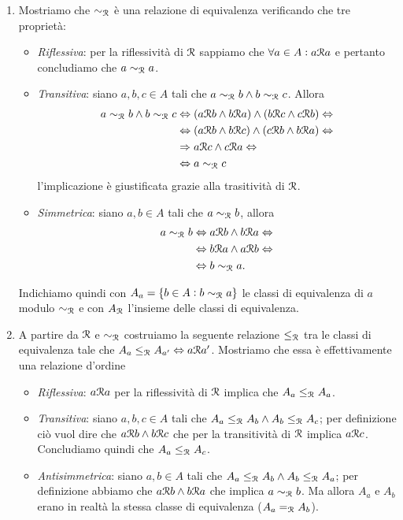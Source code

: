 \begin{enumerate}
\item Mostriamo che $ \sim_{\mathcal{R}} $ è una relazione di equivalenza verificando che tre proprietà:
  \begin{itemize}
  \item \emph{Riflessiva}: per la riflessività di $ \mathcal{R} $ sappiamo che $ \forall a \in A : a \mathcal{R} a $ e pertanto concludiamo che $ a \sim_{\mathcal{R}} a $.
  \item \emph{Transitiva}: siano $ a, b, c \in A $ tali che $ a \sim_{\mathcal{R}} b \wedge b \sim_{\mathcal{R}} c $. Allora
    \begin{align*}
      a \sim_{\mathcal{R}} b \wedge b \sim_{\mathcal{R}} c & \Leftrightarrow (a \mathcal{R} b \wedge b \mathcal{R} a) \wedge (b \mathcal{R} c \wedge c \mathcal{R} b) \Leftrightarrow \\
                                             & \Leftrightarrow (a \mathcal{R} b \wedge b \mathcal{R} c) \wedge (c \mathcal{R} b \wedge b \mathcal{R} a) \Leftrightarrow \\
                                             & \Rightarrow a \mathcal{R} c \wedge c \mathcal{R} a \Leftrightarrow \\
                                             & \Leftrightarrow a \sim_{\mathcal{R}} c
    \end{align*}
    l'implicazione è giustificata grazie alla trasitività di $ \mathcal{R} $.
  \item \emph{Simmetrica}: siano $ a, b \in A $ tali che $ a \sim_{\mathcal{R}} b $, allora
    \begin{align*}
      a \sim_{\mathcal{R}} b & \Leftrightarrow a \mathcal{R} b \wedge b \mathcal{R} a \Leftrightarrow \\
                      & \Leftrightarrow b \mathcal{R} a \wedge a \mathcal{R} b \Leftrightarrow \\
                      & \Leftrightarrow b \sim_{\mathcal{R}} a.
    \end{align*}
  \end{itemize}
  Indichiamo quindi con $ A_a = \{b \in A : b \sim_{\mathcal{R}} a\} $ le classi di equivalenza di $ a $ modulo $ \sim_{\mathcal{R}} $ e con $ A_{\mathcal{R}} $ l'insieme delle classi di equivalenza.
\item A partire da $ \mathcal{R} $ e $ \sim_{\mathcal{R}} $ costruiamo la seguente relazione $ \leq_{\mathcal{R}} $ tra le classi di equivalenza tale che $ A_a \leq_{\mathcal{R}} A_{a'} \Leftrightarrow a \mathcal{R} a' $. Mostriamo che essa è effettivamente una relazione d'ordine
  \begin{itemize}
  \item \emph{Riflessiva}: $ a \mathcal{R} a $ per la riflessività di $ \mathcal{R} $ implica che $ A_a \leq_{\mathcal{R}} A_a $.
  \item \emph{Transitiva}: siano $ a, b, c \in A $ tali che $ A_a \leq_{\mathcal{R}} A_b \wedge A_b \leq_{\mathcal{R}} A_c $; per definizione ciò vuol dire che $ a \mathcal{R} b \wedge b \mathcal{R} c $ che per la transitività di $ \mathcal{R} $ implica $ a \mathcal{R} c $. Concludiamo quindi che $ A_a \leq_{\mathcal{R}} A_c $.
  \item \emph{Antisimmetrica}: siano $ a, b \in A $ tali che $ A_a \leq_{\mathcal{R}} A_b \wedge A_b \leq_{\mathcal{R}} A_a $; per definizione abbiamo che $ a \mathcal{R} b \wedge b \mathcal{R} a $ che implica $ a \sim_{\mathcal{R}} b $. Ma allora $ A_a $ e $ A_b $ erano in realtà la stessa classe di equivalenza ($ A_a =_{\mathcal{R}} A_b $).
  \end{itemize}
\end{enumerate}

